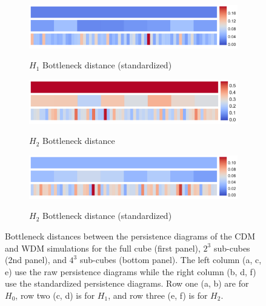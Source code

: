 \documentclass[12pt]{article}
\begin{document}
\begin{figure}[htp!]
\begin{subfigure}{.48\textwidth}
    \centering
    \caption{$H_1$ Bottleneck distance (standardized)}
    \includegraphics[width=\linewidth]{fig_12_hmap_dim1_yesnorm.pdf}
    \label{fig:cubeHeatmapStand1}
  \end{subfigure}
  \begin{subfigure}{.48\textwidth}
    \centering
    \caption{$H_2$ Bottleneck distance}
    \includegraphics[width=\linewidth]{fig_12_hmap_dim2_nonorm.pdf}
    \label{fig:cubeHeatmap2}
  \end{subfigure}
  \begin{subfigure}{.48\textwidth}
    \centering
    \caption{$H_2$ Bottleneck distance (standardized)}
    \includegraphics[width=\linewidth]{fig_12_hmap_dim2_yesnorm.pdf}
    \label{fig:cubeHeatmapStand2}
  \end{subfigure}
  \caption{Bottleneck distances between the persistence diagrams of the CDM and WDM simulations for the full cube (first panel), $2^3$ sub-cubes (2nd panel), and $4^3$ sub-cubes (bottom panel).  The left column (a, c, e) use the raw persistence diagrams while the right column (b, d, f) use the standardized persistence diagrams.  Row one (a, b) are for $H_0$, row two (c, d) is for $H_1$, and row three (e, f) is for $H_2$.
}
  \label{fig:cubeHeatmap}
\end{figure}
\end{document}
